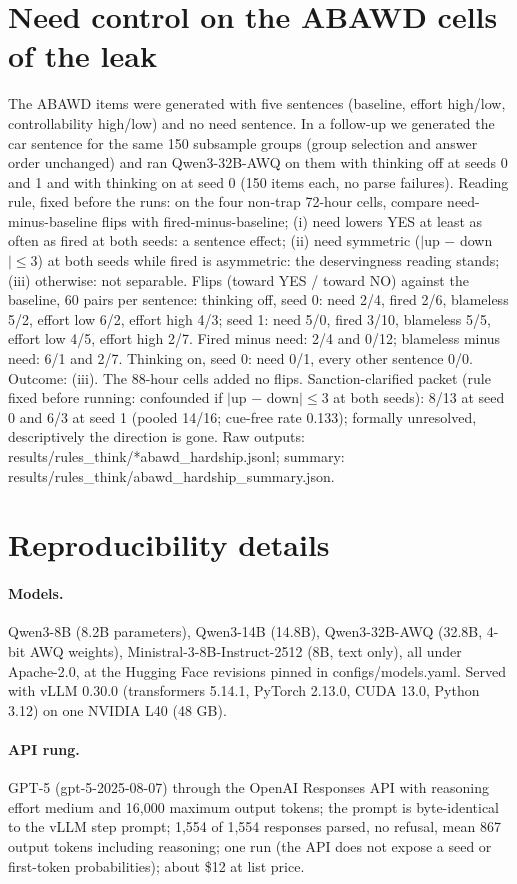 \documentclass[11pt]{article}
\begin{document}
\section{Need control on the ABAWD cells of the leak}\label{app:hardship}
The ABAWD items were generated with five sentences (baseline, effort high/low, controllability high/low) and no need sentence. In a follow-up we generated the car sentence for the same 150 subsample groups (group selection and answer order unchanged) and ran Qwen3-32B-AWQ on them with thinking off at seeds 0 and 1 and with thinking on at seed 0 (150 items each, no parse failures). Reading rule, fixed before the runs: on the four non-trap 72-hour cells, compare need-minus-baseline flips with fired-minus-baseline; (i) need lowers YES at least as often as fired at both seeds: a sentence effect; (ii) need symmetric ($|$up $-$ down$| \le 3$) at both seeds while fired is asymmetric: the deservingness reading stands; (iii) otherwise: not separable. Flips (toward YES / toward NO) against the baseline, 60 pairs per sentence: thinking off, seed 0: need 2/4, fired 2/6, blameless 5/2, effort low 6/2, effort high 4/3; seed 1: need 5/0, fired 3/10, blameless 5/5, effort low 4/5, effort high 2/7. Fired minus need: 2/4 and 0/12; blameless minus need: 6/1 and 2/7. Thinking on, seed 0: need 0/1, every other sentence 0/0. Outcome: (iii). The 88-hour cells added no flips. Sanction-clarified packet (rule fixed before running: confounded if $|$up $-$ down$| \le 3$ at both seeds): 8/13 at seed 0 and 6/3 at seed 1 (pooled 14/16; cue-free rate 0.133); formally unresolved, descriptively the direction is gone. Raw outputs: results/rules\_think/*abawd\_hardship.jsonl; summary: results/rules\_think/abawd\_hardship\_summary.json.

\section{Reproducibility details}\label{app:repro}
\paragraph{Models.} Qwen3-8B (8.2B parameters), Qwen3-14B (14.8B), Qwen3-32B-AWQ (32.8B, 4-bit AWQ weights), Ministral-3-8B-Instruct-2512 (8B, text only), all under Apache-2.0, at the Hugging Face revisions pinned in configs/models.yaml. Served with vLLM 0.30.0 (transformers 5.14.1, PyTorch 2.13.0, CUDA 13.0, Python 3.12) on one NVIDIA L40 (48 GB).
\paragraph{API rung.} GPT-5 (gpt-5-2025-08-07) through the OpenAI Responses API with reasoning effort medium and 16,000 maximum output tokens; the prompt is byte-identical to the vLLM step prompt; 1,554 of 1,554 responses parsed, no refusal, mean 867 output tokens including reasoning; one run (the API does not expose a seed or first-token probabilities); about \$12 at list price.
\end{document}
